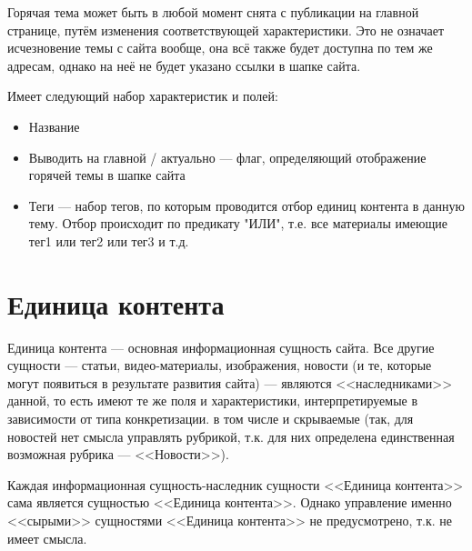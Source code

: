         Горячая тема может быть в любой момент снята с публикации на главной странице, путём изменения соответствующей характеристики. Это не означает
        исчезновение темы с сайта вообще, она всё также будет доступна по тем же адресам, однако на неё не будет указано ссылки в шапке сайта.

        Имеет следующий набор характеристик и полей:
        \begin{itemize}
            \item Название
            \item Выводить на главной / актуально --- флаг, определяющий отображение горячей темы в шапке сайта
            \item Теги --- набор тегов, по которым проводится отбор единиц контента в данную тему. Отбор происходит по предикату "ИЛИ", т.е. все материалы имеющие тег1 или тег2 или тег3 и т.д.
        \end{itemize}
    \section{Единица контента}
        Единица контента --- основная информационная сущность сайта. Все другие сущности --- статьи, видео-материалы, изображения, новости (и те, которые
        могут появиться в результате развития сайта) --- являются <<наследниками>> данной, то есть имеют те же поля и характеристики, интерпретируемые в
        зависимости от типа конкретизации. в том числе и скрываемые (так, для новостей нет смысла управлять рубрикой, т.к. для них определена единственная
        возможная рубрика --- <<Новости>>).
        
        Каждая информационная сущность-наследник сущности <<Единица контента>> сама является сущностью <<Единица контента>>. Однако управление именно 
        <<сырыми>> сущностями <<Единица контента>> не предусмотрено, т.к. не имеет смысла.
        

